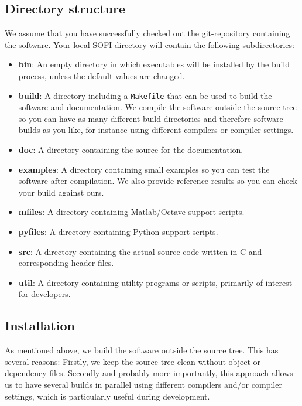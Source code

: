 \documentclass[11pt,english,a4paper]{article}
\begin{document}
\subsection{Directory structure}
\label{dirstruct}
We assume that you have successfully checked out the git-repository containing the software. Your local SOFI directory will contain the following subdirectories:
\begin{itemize}
\item \textbf{bin}: An empty directory in which executables will be installed by the build process, unless the default values are changed.
\item \textbf{build}: A directory including a \texttt{Makefile} that can be used to build the software and documentation. We compile the software outside the source tree so you can have as many different build directories and therefore software builds as you like, for instance using different compilers or compiler settings.
\item \textbf{doc}: A directory containing the source for the documentation.
\item \textbf{examples}: A directory containing small examples so you can test the software after compilation. We also provide reference results so you can check your build against ours.
\item \textbf{mfiles}: A directory containing Matlab/Octave support scripts.
\item \textbf{pyfiles}: A directory containing Python support scripts.
\item \textbf{src}: A directory containing the actual source code written in C and corresponding header files.
\item \textbf{util}: A directory containing utility programs or scripts, primarily of interest for developers.
\end{itemize}



\subsection{Installation}
\label{insta}
As mentioned above, we build the software outside the source tree. This has several reasons: Firstly, we keep the source tree clean without object or dependency files. Secondly and probably more importantly, this approach allows us to have several builds in parallel using different compilers and/or compiler settings, which is particularly useful during development.
\end{document}
